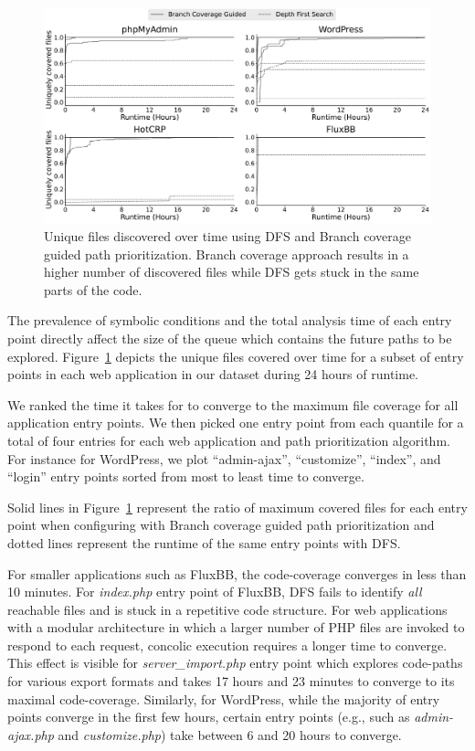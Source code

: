 {\begin{figure}[t]
    \centering
    \includegraphics[width=\textwidth]{figures/ad/execution_convergence_2rows.pdf}
    \caption{Unique files discovered over time using DFS and Branch coverage guided path prioritization. Branch coverage approach results in a higher number of discovered files while DFS gets stuck in the same parts of the code.}
    \label{fig:execution_convergence}
\end{figure}

The prevalence of symbolic conditions and the total analysis time of each entry point directly affect the size of the queue which contains the future paths to be explored. 
Figure~\ref{fig:execution_convergence} depicts the unique files covered over time for a subset of entry points in each web application in our dataset during 24 hours of runtime. 

We ranked the time it takes for \animatedead{} to converge to the maximum file coverage for all application entry points. 
We then picked one entry point from each quantile for a total of four entries for each web application and path prioritization algorithm. 
For instance for WordPress, we plot ``admin-ajax'', ``customize'', ``index'', and ``login''  entry points sorted from most to least time to converge. 

Solid lines in Figure~\ref{fig:execution_convergence} represent the ratio of maximum covered files for each entry point when configuring \animatedead{} with Branch coverage guided path prioritization and dotted lines represent the runtime of the same entry points with DFS. 

For smaller applications such as FluxBB, the code-coverage converges in less than 10 minutes. 
For \emph{index.php} entry point of FluxBB, DFS fails to identify \emph{all} reachable files and is stuck in a repetitive code structure. 
For web applications with a modular architecture in which a larger number of PHP files are invoked to respond to each request, concolic execution requires a longer time to converge. 
This effect is visible for \emph{server\_import.php} entry point which explores code-paths for various export formats and takes 17 hours and 23 minutes to converge to its maximal code-coverage. 
Similarly, for WordPress, while the majority of entry points converge in the first few hours, certain entry points (e.g., such as \emph{admin-ajax.php} and \emph{customize.php}) take between 6 and 20 hours to converge. 

}
